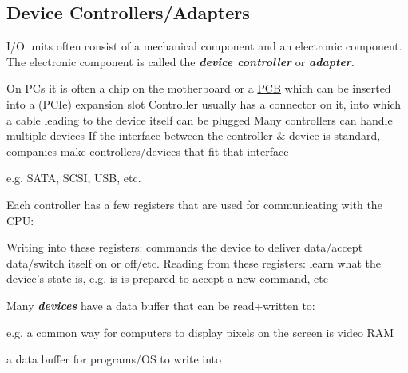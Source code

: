 \subsection*{Device Controllers/Adapters}

I/O units often consist of a mechanical component and an electronic
component. The electronic component is called the \textbf{ \textit{device
        controller}} or \textbf{ \textit{adapter}}.

\begin{itemize}

    \vItem
          On PCs it is often a chip on the motherboard or a
          \ul{PCB} which
          can be inserted into a (PCIe) expansion slot
    \vItem
          Controller usually has a connector on it, into which a cable leading
          to the device itself can be plugged
    \vItem
          Many controllers can handle multiple devices
    \vItem
          If the interface between the controller \& device is standard,
          companies make controllers/devices that fit that interface

          \begin{itemize}

              \vItem
                    e.g. SATA, SCSI, USB, etc.
          \end{itemize}
\end{itemize}

Each controller has a few registers that are used for communicating with
the CPU:

\begin{itemize}

    \vItem
          Writing into these registers: commands the device to deliver
          data/accept data/switch itself on or off/etc.
    \vItem
          Reading from these registers: learn what the device's state is,
          e.g. is is prepared to accept a new command, etc
\end{itemize}

Many \textbf{ \textit{devices}} have a data buffer that can be read+written
to:

\begin{itemize}

    \vItem
          e.g. a common way for computers to display pixels on the screen is
          video RAM

          \begin{itemize}

              \vItem
                    a data buffer for programs/OS to write into
          \end{itemize}
\end{itemize}

